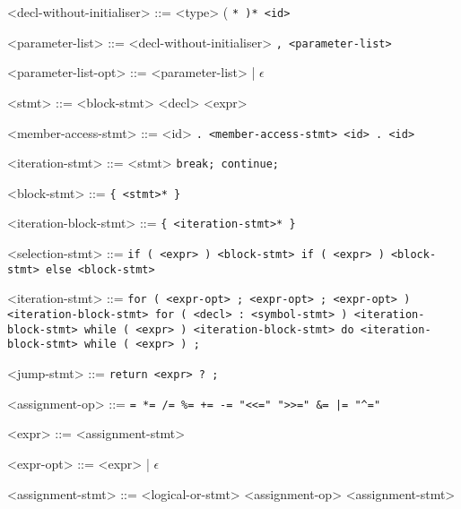 \documentclass[leqno, 12pt]{article}
\begin{document}
\begin{grammar}
            <decl-without-initialiser> ::= <type> ( \tt{*} )* <id>

            <parameter-list> ::= <decl-without-initialiser> \tt{,} <parameter-list>

            <parameter-list-opt> ::= <parameter-list> | $\epsilon$

            <stmt> ::= <block-stmt>
            \alt <decl>
            \alt <expr>
            
            <member-access-stmt> ::= <id> \tt{.} <member-access-stmt>
            \alt <id> \tt{.} <id>

            <iteration-stmt> ::= <stmt>
            \alt \tt{break};
            \alt \tt{continue};
            
            <block-stmt> ::= \tt{\{} <stmt>* \tt{\}}
            
            <iteration-block-stmt> ::= \tt{\{} <iteration-stmt>* \tt{\}}

            <selection-stmt> ::= \tt{if} \tt{(} <expr> \tt{)} <block-stmt>
            \alt \tt{if} \tt{(} <expr> \tt{)} <block-stmt> \tt{else} <block-stmt>

            <iteration-stmt> ::= \tt{for} \tt{(} <expr-opt> \tt{;} <expr-opt> \tt{;} <expr-opt> \tt{)} <iteration-block-stmt>
            \alt \tt{for} \tt{(} <decl> \tt{:} <symbol-stmt> \tt{)} <iteration-block-stmt>
            \alt \tt{while} \tt{(} <expr> \tt{)} <iteration-block-stmt>
            \alt \tt{do} <iteration-block-stmt> \tt{while} \tt{(} <expr> \tt{)} \tt{;}

            <jump-stmt> ::= \tt{return} <expr> ? \tt{;}

            <assignment-op> ::= \tt{=}
            \alt \tt{*=}
            \alt \tt{/=}
            \alt \tt{\%=}
            \alt \tt{+=}
            \alt \tt{-=}
            \alt \tt{"<<="}
            \alt \tt{">>="}
            \alt \tt{\&=}
            \alt \tt{|=}
            \alt \tt{"^="}

            <expr> ::= <assignment-stmt>

            <expr-opt> ::= <expr> | $\epsilon$

            <assignment-stmt> ::= <logical-or-stmt>
             <assignment-op> <assignment-stmt>


\end{grammar}
\end{document}
